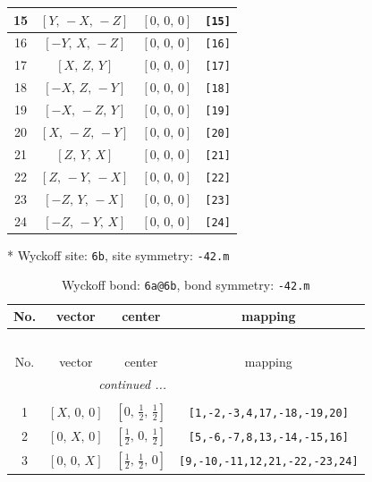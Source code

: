 \documentclass[fleqn,8pt]{jsarticle}
\begin{document}
\begin{longtable}{cccc}
15 & $\left[ Y,\, - X,\, - Z \right]$ & $\left[ 0,\, 0,\, 0 \right]$ & {\tt [15]} \\ \hline
16 & $\left[ - Y,\, X,\, - Z \right]$ & $\left[ 0,\, 0,\, 0 \right]$ & {\tt [16]} \\ \hline
17 & $\left[ X,\, Z,\, Y \right]$ & $\left[ 0,\, 0,\, 0 \right]$ & {\tt [17]} \\ \hline
18 & $\left[ - X,\, Z,\, - Y \right]$ & $\left[ 0,\, 0,\, 0 \right]$ & {\tt [18]} \\ \hline
19 & $\left[ - X,\, - Z,\, Y \right]$ & $\left[ 0,\, 0,\, 0 \right]$ & {\tt [19]} \\ \hline
20 & $\left[ X,\, - Z,\, - Y \right]$ & $\left[ 0,\, 0,\, 0 \right]$ & {\tt [20]} \\ \hline
21 & $\left[ Z,\, Y,\, X \right]$ & $\left[ 0,\, 0,\, 0 \right]$ & {\tt [21]} \\ \hline
22 & $\left[ Z,\, - Y,\, - X \right]$ & $\left[ 0,\, 0,\, 0 \right]$ & {\tt [22]} \\ \hline
23 & $\left[ - Z,\, Y,\, - X \right]$ & $\left[ 0,\, 0,\, 0 \right]$ & {\tt [23]} \\ \hline
24 & $\left[ - Z,\, - Y,\, X \right]$ & $\left[ 0,\, 0,\, 0 \right]$ & {\tt [24]} \\
\end{longtable}
* Wyckoff site: {\tt 6b}, site symmetry: {\tt -42.m}
\renewcommand{\arraystretch}{1.2}
\begin{longtable}{cccc}
\caption{Wyckoff bond: {\tt 6a@6b}, bond symmetry: {\tt -42.m}}
 \\
 \hline \hline
No. & vector & center & mapping \\ \hline \endfirsthead

\multicolumn{3}{l}{\tablename\ \thetable{}} \\
 \hline \hline
No. & vector & center & mapping \\ \hline \endhead

 \hline \hline
\multicolumn{3}{r}{\footnotesize\it continued ...} \\ \endfoot

 \hline \hline
\multicolumn{3}{r}{} \\ \endlastfoot

1 & $\left[ X,\, 0,\, 0 \right]$ & $\left[ 0,\, \frac{1}{2},\, \frac{1}{2} \right]$ & {\tt [1,-2,-3,4,17,-18,-19,20]} \\ \hline
2 & $\left[ 0,\, X,\, 0 \right]$ & $\left[ \frac{1}{2},\, 0,\, \frac{1}{2} \right]$ & {\tt [5,-6,-7,8,13,-14,-15,16]} \\ \hline
3 & $\left[ 0,\, 0,\, X \right]$ & $\left[ \frac{1}{2},\, \frac{1}{2},\, 0 \right]$ & {\tt [9,-10,-11,12,21,-22,-23,24]} \\
\end{longtable}
\end{document}

